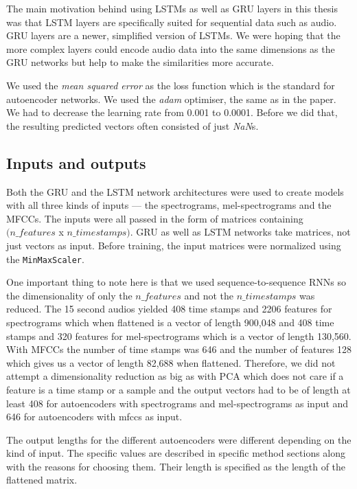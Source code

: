 The main motivation behind using LSTMs as well as GRU layers in this thesis was that LSTM layers are specifically suited for sequential data such as audio. GRU layers are a newer, simplified version of LSTMs. We were hoping that the more complex layers could encode audio data into the same dimensions as the GRU networks but help to make the similarities more accurate. 



We used the \textit{mean squared error} as the loss function which is the standard for autoencoder networks. We used the \textit{adam} optimiser, the same as in the \cite{inproceedings_RNNs} paper. We had to decrease the learning rate from 0.001 to 0.0001. Before we did that, the resulting predicted vectors often consisted of just \textit{NaN}s.

\subsection{Inputs and outputs}
Both the GRU and the LSTM network architectures were used to create models with all three kinds of inputs --- the spectrograms, mel-spectrograms and the MFCCs. The inputs were all passed in the form of matrices containing $(n\_features $ x $n\_timestamps)$. GRU as well as LSTM networks take matrices, not just vectors as input. Before training, the input matrices were normalized using the \texttt{MinMaxScaler}. 

One important thing to note here is that we used sequence-to-sequence RNNs so the dimensionality of only the $ n\_features $ and not the $ n\_timestamps $ was reduced. The 15 second audios yielded 408 time stamps and 2206 features for spectrograms which when flattened is a vector of length 900,048 and 408 time stamps and 320 features for mel-spectrograms which is a vector of length 130,560. With MFCCs the number of time stamps was 646 and the number of features 128 which gives us a vector of length 82,688 when flattened. Therefore, we did not attempt a dimensionality reduction as big as with PCA which does not care if a feature is a time stamp or a sample and the output vectors had to be of length at least 408 for autoencoders with spectrograms and mel-spectrograms as input and 646 for autoencoders with mfccs as input. 

The output lengths for the different autoencoders were different depending on the kind of input. The specific values are described in specific method sections along with the reasons for choosing them. Their length is specified as the length of the flattened matrix.

